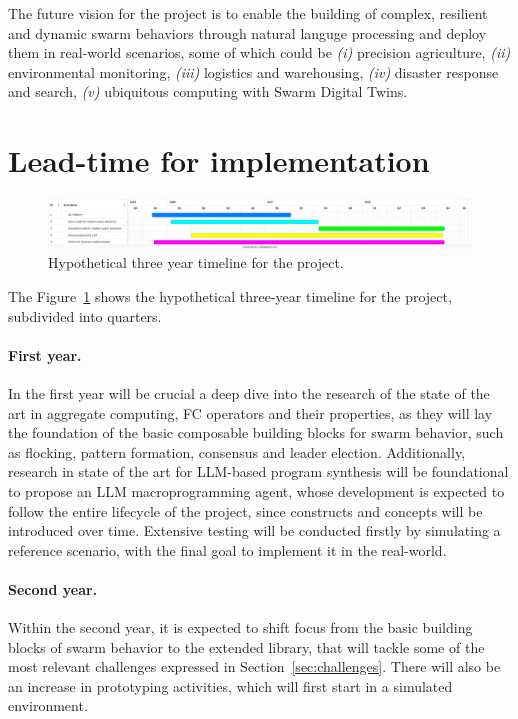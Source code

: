 \documentclass[12pt]{article}
\begin{document}
The future vision for the project is to enable the building of complex, resilient and dynamic swarm behaviors through natural languge processing and deploy them in real-world scenarios, some of which could be \textit{(i)} precision agriculture,
\textit{(ii)} environmental monitoring, \textit{(iii)} logistics and warehousing, \textit{(iv)} disaster response and search, 
\textit{(v)} ubiquitous computing with Swarm Digital Twins.

\section{Lead-time for implementation}
\begin{figure}
	\includegraphics[width=\linewidth]{figures/timeline.png}
	\caption{Hypothetical three year timeline for the project.}
	\label{fig:timeline}
\end{figure}

The Figure~\ref{fig:timeline} shows the hypothetical three-year timeline for the project, subdivided into quarters.

\paragraph{First year.} In the first year will be crucial a deep dive into the research of the state of the art in aggregate computing, FC operators and their properties, as they will lay the foundation of the basic composable building blocks for swarm behavior, such as flocking, pattern formation, consensus and leader election.
Additionally, research in state of the art for LLM-based program synthesis will be foundational to propose an LLM macroprogramming agent, whose development is expected to follow the entire lifecycle of the project, since constructs and concepts will be introduced over time. 
Extensive testing will be conducted firstly by simulating a reference scenario, with the final goal to implement it in the real-world.

\paragraph{Second year.} Within the second year, it is expected to shift focus from the basic building blocks of swarm behavior to the extended library, that will tackle some of the most relevant challenges expressed in Section~\ref{sec:challenges}.
There will also be an increase in prototyping activities, which will first start in a simulated environment.
\end{document}
